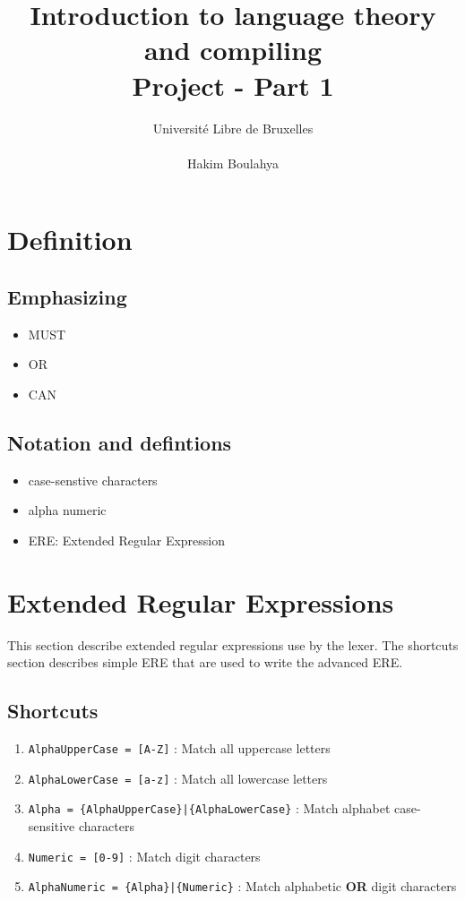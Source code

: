 \documentclass[letterpaper]{article}
\title{Introduction to language theory and compiling
\\ Project - Part 1}
\author{Université Libre de Bruxelles \\
\\ Hakim Boulahya}
\begin{document}
\maketitle
\tableofcontents
\section{Definition}

\subsection{Emphasizing}

\begin{itemize}
    \item MUST
    \item OR
    \item CAN
\end{itemize}

\subsection{Notation and defintions}

\begin{itemize}
    \item case-senstive characters
    \item alpha numeric
    \item ERE: Extended Regular Expression
\end{itemize}

\section{Extended Regular Expressions}
This section describe extended regular expressions use by the lexer.
The shortcuts section describes simple ERE that are used to write
the advanced ERE.
\subsection{Shortcuts}

\begin{enumerate}
    \item \texttt{AlphaUpperCase = [A-Z]} : Match all uppercase letters
    \item \texttt{AlphaLowerCase = [a-z]} : Match all lowercase letters
    \item \texttt{Alpha = \{AlphaUpperCase\}|\{AlphaLowerCase\}} :
    Match alphabet case-sensitive characters
    \item \texttt{Numeric = [0-9]} : Match digit characters
    \item \texttt{AlphaNumeric = \{Alpha\}|\{Numeric\}} :
    Match alphabetic \textbf{OR} digit characters
\end{enumerate}
\end{document}
